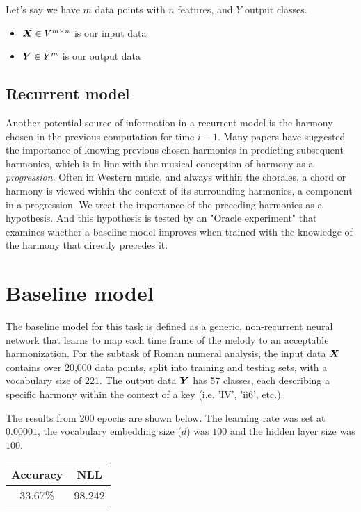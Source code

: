 \documentclass[12pt]{article}
\begin{document}
\noin Let's say we have $m$ data points with $n$ features, and $Y$ output classes.
\begin{itemize}
\item $\boldsymbol{X} \in V^{m \times n}$ is our input data
\item $\boldsymbol{Y} \in Y^m$ is our output data
\end{itemize}

\subsection{Recurrent model}

Another potential source of information in a recurrent model is the harmony chosen in the previous computation for time $i-1$. Many papers have suggested the importance of knowing previous chosen harmonies in predicting subsequent harmonies, which is in line with the musical conception of harmony as a \textit{progression}. Often in Western music, and always within the chorales, a chord or harmony is viewed within the context of its surrounding harmonies, a component in a progression. We treat the importance of the preceding harmonies as a hypothesis. And this hypothesis is tested by an "Oracle experiment" that examines whether a baseline model improves when trained with the knowledge of the harmony that directly precedes it.    


\section{Baseline model}

The baseline model for this task is defined as a generic, non-recurrent neural network that learns to map each time frame of the melody to an acceptable harmonization. For the subtask of Roman numeral analysis, the input data $\boldsymbol{X}$ contains over 20,000 data points, split into training and testing sets, with a vocabulary size of 221. The output data $\boldsymbol{Y}$ has 57 classes, each describing a specific harmony within the context of a key (i.e. 'IV', 'ii6', etc.).

The results from 200 epochs are shown below. The learning rate was set at $0.00001$, the vocabulary embedding size ($d$) was $100$ and the hidden layer size was $100$. 

\begin{center}
  \begin{tabular}{ c | c }
    Accuracy & NLL \\ \hline
    33.67\% & 98.242
  \end{tabular}
\end{center}
\end{document}
